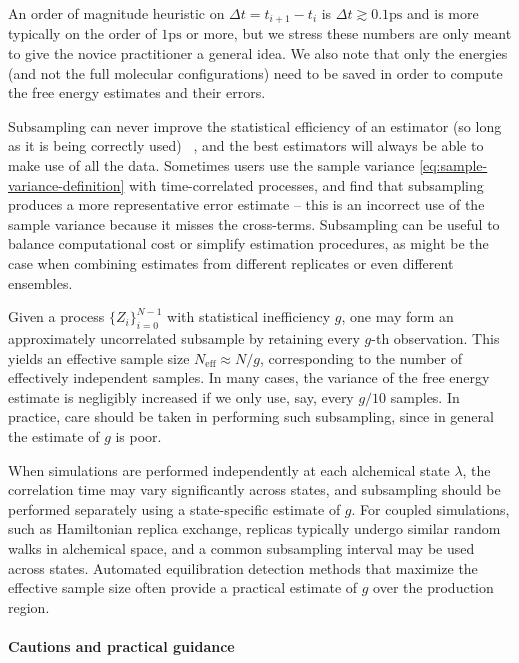 \documentclass[9pt,bestpractices]{livecoms}
\begin{document}
An order of magnitude heuristic on $\Delta t =t_{i+1} - t_i$ is $\Delta t \gtrsim 0.1 \mathrm{ps}$ and is more typically on the order of $1 \mathrm{ps}$ or more,  but we stress these numbers are only meant to give the novice practitioner a general idea. We also note that only the energies (and not the full molecular configurations) need to be saved in order to compute the free energy estimates and their errors. 

Subsampling can never improve the statistical efficiency of an estimator (so long as it is being correctly used) ~\cite{LinkEaton2012,maceachern1994subsampling,geyer1992practical}, and the best estimators will always be able to make use of all the data. Sometimes users use the sample variance \eqref{eq:sample-variance-definition} with time-correlated processes, and find that subsampling produces a more representative error estimate -- this is an incorrect use of the sample variance because it misses the cross-terms. Subsampling can be useful to balance computational cost or simplify estimation procedures, as might be the case when combining estimates from different replicates or even different ensembles. 

Given a process $\{Z_i\}_{i=0}^{N-1}$ with statistical inefficiency $g$, one may form an approximately uncorrelated subsample by retaining every $g$-th observation. This yields an effective sample size $N_{\mathrm{eff}} \approx N / g$, corresponding to the number of effectively independent samples. In many cases, the variance of the free energy estimate is negligibly increased if we only use, say, every $g/10$ samples. In practice, care should be taken in performing such subsampling, since in general the estimate of $g$ is poor. 

When simulations are performed independently at each alchemical state $\lambda$, the correlation time may vary significantly across states, and subsampling should be performed separately using a state-specific estimate of $g$. For coupled simulations, such as Hamiltonian replica exchange, replicas typically undergo similar random walks in alchemical space, and a common subsampling interval may be used across states. Automated equilibration detection methods that maximize the effective sample size often provide a practical estimate of $g$ over the production region.

\paragraph{Cautions and practical guidance}
\end{document}

